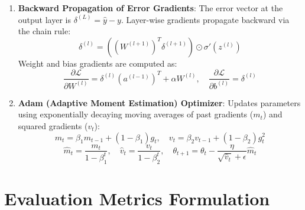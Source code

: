 \documentclass[12pt,a4paper]{article}
\begin{document}
\begin{enumerate}
\item \textbf{Backward Propagation of Error Gradients}: The error vector at the output layer is $\delta^{(L)} = \hat{y} - y$. Layer-wise gradients propagate backward via the chain rule:
\begin{equation}
\delta^{(l)} = ((W^{(l+1)})^T \delta^{(l+1)}) \odot \sigma'(z^{(l)})
\end{equation}
Weight and bias gradients are computed as:
\begin{equation}
\frac{\partial \mathcal{L}}{\partial W^{(l)}} = \delta^{(l)} (a^{(l-1)})^T + \alpha W^{(l)}, \quad \frac{\partial \mathcal{L}}{\partial b^{(l)}} = \delta^{(l)}
\end{equation}
\item \textbf{Adam (Adaptive Moment Estimation) Optimizer}: Updates parameters using exponentially decaying moving averages of past gradients ($m_t$) and squared gradients ($v_t$):
\begin{equation}
m_t = \beta_1 m_{t-1} + (1 - \beta_1) g_t, \quad v_t = \beta_2 v_{t-1} + (1 - \beta_2) g_t^2
\end{equation}
\begin{equation}
\hat{m}_t = \frac{m_t}{1 - \beta_1^t}, \quad \hat{v}_t = \frac{v_t}{1 - \beta_2^t}, \quad \theta_{t+1} = \theta_t - \frac{\eta}{\sqrt{\hat{v}_t} + \epsilon} \hat{m}_t
\end{equation}
\end{enumerate}

\section{Evaluation Metrics Formulation}
\end{document}

